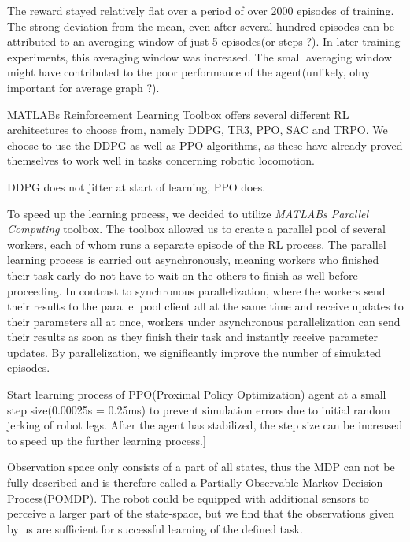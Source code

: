 The reward stayed relatively flat over a period of over 2000 episodes of training.
The strong deviation from the mean, even after several hundred episodes can be attributed to an averaging window of just 5 episodes(or steps ?). 
In later training experiments, this averaging window was increased.
The small averaging window might have contributed to the poor performance of the agent(unlikely, olny important for average graph ?).

MATLABs Reinforcement Learning Toolbox offers several different RL architectures to choose from, namely DDPG, TR3, PPO, SAC and TRPO.
We choose to use the DDPG as well as PPO algorithms, as these have already proved themselves to work well in tasks concerning robotic locomotion\parencite{FIND AUTHOR}.




DDPG does not jitter at start of learning, PPO does.

To speed up the learning process, we decided to utilize \textit{MATLABs Parallel Computing} toolbox.
The toolbox allowed us to create a parallel pool of several workers, each of whom runs a separate episode of the RL process.
The parallel learning process is carried out asynchronously, meaning workers who finished their task early do not have to wait on the others to finish as well before proceeding.
In contrast to synchronous parallelization, where the workers send their results to the parallel pool client all at the same time and receive updates to their parameters all at once, workers under asynchronous parallelization can send their results as soon as they finish their task and instantly receive parameter updates.
By parallelization, we significantly improve the number of simulated episodes.



Start learning process of PPO(Proximal Policy Optimization) agent at a small step size(0.00025s = 0.25ms) to prevent simulation errors due to initial random jerking of robot legs.
After the agent has stabilized, the step size can be increased to speed up the further learning process.]


Observation space only consists of a part of all states, thus the MDP can not be fully described and is therefore called a Partially Observable Markov Decision Process(POMDP).
The robot could be equipped with additional sensors to perceive a larger part of the state-space, but we find that the observations given by us are sufficient for successful learning of the defined task.


